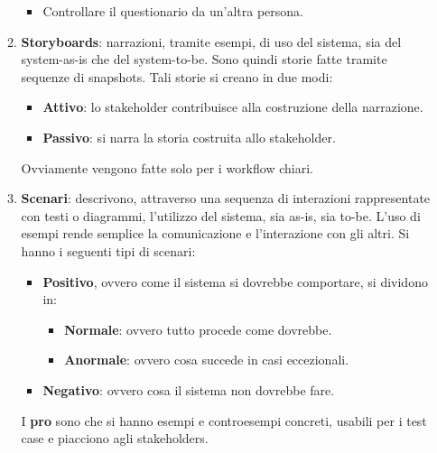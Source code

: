\begin{itemize}
\begin{enumerate}
\begin{itemize}
                              \item Controllare il questionario da un'altra persona.
                        \end{itemize}
                  \item \textbf{Storyboards}: narrazioni, tramite esempi, di uso
                        del sistema, sia del system-as-is che del system-to-be.
                        Sono quindi storie fatte tramite sequenze di snapshots.
                        Tali storie si creano in due modi:
                        \begin{itemize}
                              \item \textbf{Attivo}: lo stakeholder contribuisce
                                    alla costruzione della narrazione.
                              \item \textbf{Passivo}: si narra la storia
                                    costruita allo stakeholder.
                        \end{itemize}
                        Ovviamente vengono fatte solo per i workflow chiari.
                  \item \textbf{Scenari}: descrivono, attraverso una sequenza di
                        interazioni rappresentate con testi o diagrammi, l'utilizzo
                        del sistema, sia as-is, sia to-be. L'uso di esempi rende
                        semplice la comunicazione e l'interazione con gli altri.
                        Si hanno i seguenti tipi di scenari:
                        \begin{itemize}
                              \item \textbf{Positivo}, ovvero come il sistema si
                                    dovrebbe comportare, si dividono in:
                                    \begin{itemize}
                                          \item \textbf{Normale}: ovvero tutto
                                                procede come dovrebbe.
                                          \item \textbf{Anormale}: ovvero cosa
                                                succede in casi eccezionali.
                                    \end{itemize}
                              \item \textbf{Negativo}: ovvero cosa il sistema
                                    non dovrebbe fare.
                        \end{itemize}
                        I \textbf{pro} sono che si hanno esempi e controesempi
                        concreti, usabili per i test case e piacciono agli
                        stakeholders.


\end{enumerate}
\end{itemize}
